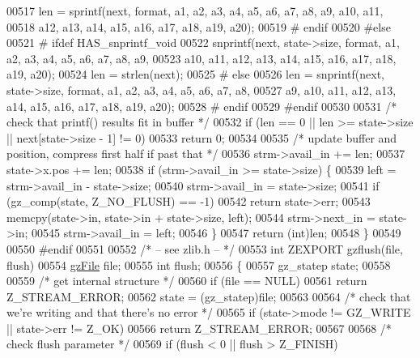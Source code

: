 \begin{DoxyCode}
00517     len = sprintf(next, format, a1, a2, a3, a4, a5, a6, a7, a8, a9, a10, a11,
00518                   a12, a13, a14, a15, a16, a17, a18, a19, a20);
00519 \textcolor{preprocessor}{#  endif}
00520 \textcolor{preprocessor}{#else}
00521 \textcolor{preprocessor}{#  ifdef HAS\_snprintf\_void}
00522     snprintf(next, state->size, format, a1, a2, a3, a4, a5, a6, a7, a8, a9,
00523              a10, a11, a12, a13, a14, a15, a16, a17, a18, a19, a20);
00524     len = strlen(next);
00525 \textcolor{preprocessor}{#  else}
00526     len = snprintf(next, state->size, format, a1, a2, a3, a4, a5, a6, a7, a8,
00527                    a9, a10, a11, a12, a13, a14, a15, a16, a17, a18, a19, a20);
00528 \textcolor{preprocessor}{#  endif}
00529 \textcolor{preprocessor}{#endif}
00530 
00531     \textcolor{comment}{/* check that printf() results fit in buffer */}
00532     \textcolor{keywordflow}{if} (len == 0 || len >= state->size || next[state->size - 1] != 0)
00533         \textcolor{keywordflow}{return} 0;
00534 
00535     \textcolor{comment}{/* update buffer and position, compress first half if past that */}
00536     strm->avail\_in += len;
00537     state->x.pos += len;
00538     \textcolor{keywordflow}{if} (strm->avail\_in >= state->size) \{
00539         left = strm->avail\_in - state->size;
00540         strm->avail\_in = state->size;
00541         \textcolor{keywordflow}{if} (gz\_comp(state, Z\_NO\_FLUSH) == -1)
00542             \textcolor{keywordflow}{return} state->err;
00543         memcpy(state->in, state->in + state->size, left);
00544         strm->next\_in = state->in;
00545         strm->avail\_in = left;
00546     \}
00547     \textcolor{keywordflow}{return} (\textcolor{keywordtype}{int})len;
00548 \}
00549 
00550 \textcolor{preprocessor}{#endif}
00551 
00552 \textcolor{comment}{/* -- see zlib.h -- */}
00553 \textcolor{keywordtype}{int} ZEXPORT gzflush(file, flush)
00554     \hyperlink{structgz_file__s}{gzFile} file;
00555     \textcolor{keywordtype}{int} flush;
00556 \{
00557     gz\_statep state;
00558 
00559     \textcolor{comment}{/* get internal structure */}
00560     \textcolor{keywordflow}{if} (file == NULL)
00561         \textcolor{keywordflow}{return} Z\_STREAM\_ERROR;
00562     state = (gz\_statep)file;
00563 
00564     \textcolor{comment}{/* check that we're writing and that there's no error */}
00565     \textcolor{keywordflow}{if} (state->mode != GZ\_WRITE || state->err != Z\_OK)
00566         \textcolor{keywordflow}{return} Z\_STREAM\_ERROR;
00567 
00568     \textcolor{comment}{/* check flush parameter */}
00569     \textcolor{keywordflow}{if} (flush < 0 || flush > Z\_FINISH)

\end{DoxyCode}

